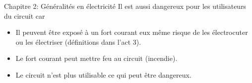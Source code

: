 \documentclass[24pt]{article}
\newcommand{\titre}{Chapitre 2: Généralités en électricité} %
\begin{document}
\begin{titlebox}{\titre}
    Il est aussi dangereux pour les utilisateurs du circuit car 
    
    \begin{itemize}
        \item Il peuvent être exposé à un fort courant eux même 
        risque de les électrocuter ou les électriser (définitions dans l'act 3).
        \item Le fort courant peut mettre feu au circuit (incendie).
        \item Le circuit n'est plus utilisable ce qui peut être dangereux.      
    \end{itemize}

\end{titlebox}
\end{document}
